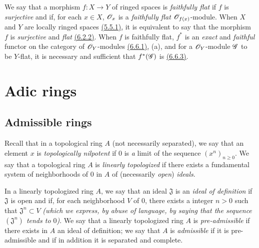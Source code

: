 \begin{env}[6.7.8]
\label{env-0.6.7.8}
We say that a morphism $f:X\to Y$ of ringed spaces is {\em faithfully flat} if $f$ is
{\em surjective} and if, for each $x\in X$, $\mathscr{O}_x$ is a {\em faithfully flat}
$\mathscr{O}_{f(x)}$-module. When $X$ and $Y$ are locally ringed spaces \hyperref[env-0.5.5.1]{(5.5.1)}, it is
equivalent to say that the morphism $f$ is {\em surjective} and {\em flat}
\hyperref[env-0.6.6.2]{(6.2.2)}. When $f$ is faithfully flat, $f^*$ is an {\em exact} and {\em faithful}
functor on the category of $\mathscr{O}_Y$-modules \hyperref[env-0.6.6.1]{(6.6.1)}, (a), and for a $\mathscr{O}_Y$-module
$\mathscr{G}$ to be $Y$-flat, it is necessary and sufficient that $f^*(\mathscr{G})$ is
\hyperref[env-0.6.6.3]{(6.6.3)}.
\end{env}

\section{Adic rings}
\label{section-adic-rings}

\subsection{Admissible rings}
\label{subsection-admissible-rings}

\begin{env}[7.1.1]
\label{env-0.7.1.1}
Recall that in a topological ring $A$ (not necessarily separated), we say that an element $x$
is {\em topologically nilpotent} if $0$ is {\em a} limit of the sequence
$(x^n)_{n\geqslant 0}$. We say that a topological ring $A$ is {\em linearly topologized} if
there exists a fundamental system of neighborhoods of $0$ in $A$ of (necessarily {\em open})
{\em ideals}.
\end{env}

\begin{defn}[7.1.2]
\label{defn-0.7.1.2}
In a linearly topologized ring $A$, we say that an ideal $\mathfrak{J}$ is an {\em ideal of
definition} if $\mathfrak{J}$ is open and if, for each neighborhood $V$ of $0$, there exists
a integer $n>0$ such
that $\mathfrak{J}^n\subset V$ {\em (which we express, by abuse of language, by saying that
the sequence $(\mathfrak{J}^n)$ {\em tends to $0$})}. We say that a linearly topologized
ring $A$ is {\em pre-admissible} if there exists in $A$ an ideal of definition; we say that
$A$ is {\em admissible} if it is pre-admissible and if in addition it is separated and
complete.
\end{defn}

